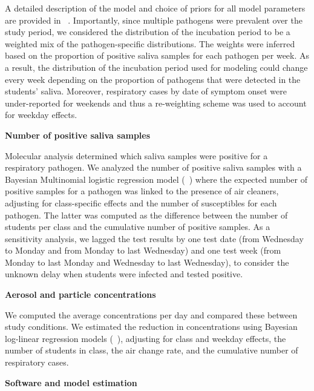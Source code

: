 \documentclass[fleqn,11pt]{wlscirep}
\begin{document}
A detailed description of the model and choice of priors for all model parameters are provided in \supp~. Importantly, since multiple pathogens were prevalent over the study period, we considered the distribution of the incubation period to be a weighted mix of the pathogen-specific distributions. The weights were inferred based on the proportion of positive saliva samples for each pathogen per week. As a result, the distribution of the incubation period used for modeling could change every week depending on the proportion of pathogens that were detected in the students' saliva. Moreover, respiratory cases by date of symptom onset were under-reported for weekends and thus a re-weighting scheme was used to account for weekday effects. \medskip

\noindent\textbf{Number of positive saliva samples} \smallskip

\noindent Molecular analysis determined which saliva samples were positive for a respiratory pathogen. We analyzed the number of positive saliva samples with a Bayesian Multinomial logistic regression model (\supp~) where the expected number of positive samples for a pathogen was linked to the presence of air cleaners, adjusting for class-specific effects and the number of susceptibles for each pathogen. The latter was computed as the difference between the number of students per class and the cumulative number of positive samples. As a sensitivity analysis, we lagged the test results by one test date (\ie from Wednesday to Monday and from Monday to last Wednesday) and one test week (\ie from Monday to last Monday and Wednesday to last Wednesday), to consider the unknown delay when students were infected and tested positive. 

\noindent\textbf{Aerosol and particle concentrations} \smallskip

\noindent We computed the average concentrations per day and compared these between study conditions. We estimated the reduction in concentrations using Bayesian log-linear regression models (\supp~), adjusting for class and weekday effects, the number of students in class, the air change rate, and the cumulative number of respiratory cases. \medskip


\noindent\textbf{Software and model estimation} \smallskip
\end{document}
